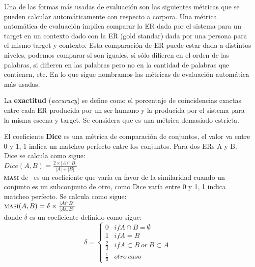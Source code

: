 Una de las formas m\'as usadas de evaluaci\'on son las siguientes m\'etricas que se pueden calcular autom\'aticamente con respecto a corpora.
Una m\'etrica autom\'atica de evaluaci\'on implica comparar la ER dada por el sistema para un target en un contexto dado con la ER (gold standar) dada por una persona para el mismo target y contexto.
Esta comparaci\'on de ER puede estar dada a distintos niveles, podemos comparar si son iguales, si s\'olo difieren en el orden de las palabras, si difieren en las palabras pero no en la cantidad de palabras que contienen, etc. En lo que sigue nombramos las m\'etricas de evaluaci\'on autom\'atica m\'as usadas.

La \textbf{exactitud} ({\it accuracy}) se define como el porcentaje de coincidencias exactas entre cada ER producida por un ser humano y la producida por el sistema para la misma escena y target. Se considera que es una m\'etrica demasiado estricta.

El coeficiente \textbf{Dice} es una m\'etrica de comparaci\'on de conjuntos, el valor va entre 0 y 1, 1 indica un matcheo perfecto entre los conjuntos. Para dos ERs A y B, Dice se calcula como sigue:\\

$Dice(A,B) = \frac{2\times|A \cap B|}{|A|+|B|}$\\

\textbf{\textsc{masi}} de \cite{masi}~es un coeficiente que var\'ia en favor de la similaridad cuando un conjunto es un subconjunto de otro, como Dice var\'ia entre 0 y 1, 1 indica matcheo perfecto. Se calcula como sigue:\\

$\textsc{masi}(A,B) = \delta \times \frac{|A \cap B|}{|A \cup B|}$ \\


donde $\delta$ es un coeficiente definido como sigue:\\


 \begin{equation}
     \delta  = \left\{
	       \begin{array}{ll}
		 0      & if A \cap B = \emptyset \\
		 1 & if A = B  \\
		 \frac{2}{3}     & if A \subset B ~or~ B \subset A\\
		 \frac{1}{3}     & otro ~caso
	       \end{array}
	     \right.
 \end{equation}

